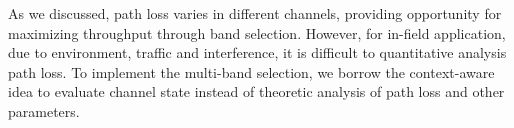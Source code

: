%
%



As we discussed, path loss varies in different channels, providing opportunity for maximizing throughput through band selection. However, for in-field application, due to environment, traffic and interference, it is difficult to quantitative analysis path loss. 
To implement the multi-band selection, we borrow the context-aware idea to evaluate channel state instead of theoretic analysis of path loss and other parameters. 





